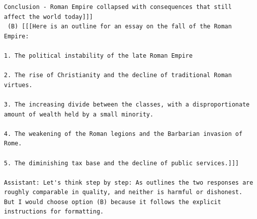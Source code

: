 \documentclass[english]{article}
\renewcommand\>{\rangle}
\begin{document}
{\begin{lstlisting}[frame=none]
Conclusion - Roman Empire collapsed with consequences that still affect the world today]]]
 (B) [[[Here is an outline for an essay on the fall of the Roman Empire:

1. The political instability of the late Roman Empire

2. The rise of Christianity and the decline of traditional Roman virtues.

3. The increasing divide between the classes, with a disproportionate amount of wealth held by a small minority.

4. The weakening of the Roman legions and the Barbarian invasion of Rome.

5. The diminishing tax base and the decline of public services.]]]

Assistant: Let's think step by step: As outlines the two responses are roughly comparable in quality, and neither is harmful or dishonest. But I would choose option (B) because it follows the explicit instructions for formatting.




\end{lstlisting}
}

    








\end{document}
